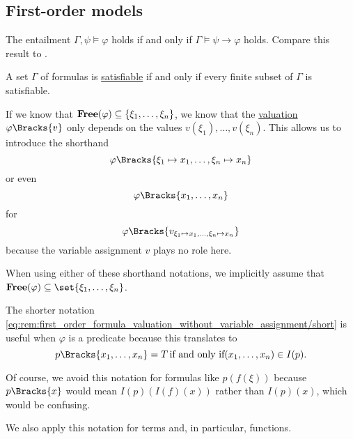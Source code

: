 \subsection{First-order models}\label{subsec:first_order_models}

\begin{theorem}\label{thm:semantic_deduction_theorem}
  The entailment \( \Gamma, \psi \vDash \varphi \) holds if and only if \( \Gamma \vDash \psi \to \varphi \) holds. Compare this result to .
\end{theorem}

\begin{theorem}\label{thm:first_order_compactness_theorem}
  A set \( \Gamma \) of formulas is \hyperref[def:propositional_semantics/satisfiability]{satisfiable} if and only if every finite subset of \( \Gamma \) is satisfiable.
\end{theorem}

\begin{remark}\label{rem:first_order_formula_valuation_without_variable_assignment}
  If we know that \( \operatorname{\mathbf{Free}}(\varphi) \subseteq \{ \xi_1, \ldots, \xi_n \} \), we know that the \hyperref[def:first_order_valuation/formula_valuation]{valuation} \( \varphi\Bracks{v} \) only depends on the values \( v(\xi_1), \ldots, v(\xi_n) \). This allows us to introduce the shorthand
  \begin{equation}\label{eq:rem:first_order_formula_valuation_without_variable_assignment/long}
    \varphi\Bracks{\xi_1 \mapsto x_1, \ldots, \xi_n \mapsto x_n}
  \end{equation}
  or even
  \begin{equation}\label{eq:rem:first_order_formula_valuation_without_variable_assignment/short}
    \varphi\Bracks{x_1, \ldots, x_n}
  \end{equation}
  for
  \begin{equation*}
    \varphi\Bracks{v_{\xi_1 \mapsto x_1, \ldots, \xi_n \mapsto x_n}}
  \end{equation*}
  because the variable assignment \( v \) plays no role here.

  When using either of these shorthand notations, we implicitly assume that \( \boldop{Free}(\varphi) \subseteq \set{ \xi_1, \ldots, \xi_n } \).

  The shorter notation \eqref{eq:rem:first_order_formula_valuation_without_variable_assignment/short} is useful when \( \varphi \) is a predicate because this translates to
  \begin{equation*}
    p\Bracks{x_1, \ldots, x_n} = T \T{if and only if} (x_1, \ldots, x_n) \in I(p).
  \end{equation*}

  Of course, we avoid this notation for formulas like \( p(f(\xi)) \) because \( p\Bracks{x} \) would mean \( I(p)(I(f)(x)) \) rather than \( I(p)(x) \), which would be confusing.

  We also apply this notation for terms and, in particular, functions.
\end{remark}


